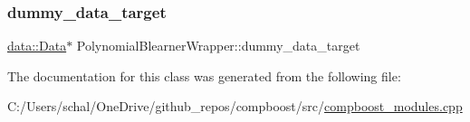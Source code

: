 \subsubsection{\texorpdfstring{dummy\+\_\+data\+\_\+target}{dummy\_data\_target}}
{\footnotesize\ttfamily \mbox{\hyperlink{classdata_1_1_data}{data\+::\+Data}}$\ast$ Polynomial\+Blearner\+Wrapper\+::dummy\+\_\+data\+\_\+target\hspace{0.3cm}{\ttfamily [private]}}



The documentation for this class was generated from the following file\+:\begin{DoxyCompactItemize}
\item 
C\+:/\+Users/schal/\+One\+Drive/github\+\_\+repos/compboost/src/\mbox{\hyperlink{compboost__modules_8cpp}{compboost\+\_\+modules.\+cpp}}\end{DoxyCompactItemize}

